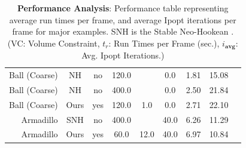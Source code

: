 \begin{table}[]
\begin{tabular}{@{}rcccccccc@{}}
		Ball (Coarse) & NH & no & 120.0 & & 0.0 & 1.81 & 15.08 \\
		Ball (Coarse) & NH & no & 400.0 & & 0.0 & 2.50 & 21.84 \\
		Ball (Coarse) & Ours & yes & 120.0 & 1.0 & 0.0 & 2.71 & 22.10 \\
		\midrule
		Armadillo & SNH & no & 400.0 & & 40.0 & 6.26 & 11.29 \\
		Armadillo & Ours & yes & 60.0 & 12.0 & 40.0 & 6.97 & 10.84 \\
		\bottomrule
	\end{tabular}%
	\caption{\textbf{Performance Analysis}: Performance table representing average run times per frame, and average Ipopt iterations per frame for major examples. SNH is the Stable Neo-Hookean
		\cite{Smith:2018}. (VC: Volume Constraint, $t_r$: Run Times per Frame (sec.), $i_{\textbf{avg}}$: Avg. Ipopt Iterations.)}
	\label{tab:performance}
\end{table}